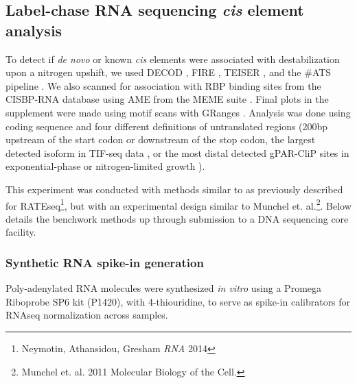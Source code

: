 \subsection{Label-chase RNA sequencing \textit{cis} element analysis}

To detect if \textit{de novo} or known \textit{cis} elements were 
associated with destabilization upon a nitrogen upshift,
we used 
DECOD \parencite{huggins2011decod}, FIRE
\parencite{elemento2007universal},
TEISER \parencite{goodarzi2012systematic}, and the \#ATS pipeline
\parencite{li2010predicting}. 
We also scanned for association with
RBP binding sites from the CISBP-RNA database
\parencite{ray2013compendium} using AME from the MEME suite
\parencite{mcleay2010motif}. 
Final plots in the supplement were made using motif scans with 
GRanges \parencite{lawrence2013software}.
Analysis was done using coding sequence and 
four different definitions of untranslated regions 
(200bp upstream of the start codon or downstream of the stop codon, 
the largest detected isoform in TIF-seq data
\parencite{pelechano2014genome},
or the most distal detected gPAR-CliP sites in exponential-phase 
or nitrogen-limited growth \parencite{freeberg2013pervasive}).





This experiment was conducted with methods similar to as previously
described for RATEseq\footnote{Neymotin, Athansidou, Gresham \emph{RNA}
  2014}, but with an experimental design similar to Munchel et.
al.\footnote{Munchel et. al. 2011 Molecular Biology of the Cell.}. Below
details the benchwork methods up through submission to a DNA sequencing
core facility.

\subsubsection{Synthetic RNA spike-in generation}

Poly-adenylated RNA molecules were synthesized \emph{in vitro} using a
Promega Riboprobe SP6 kit (P1420), with 4-thiouridine, to serve as
spike-in calibrators for RNAseq normalization across samples.

